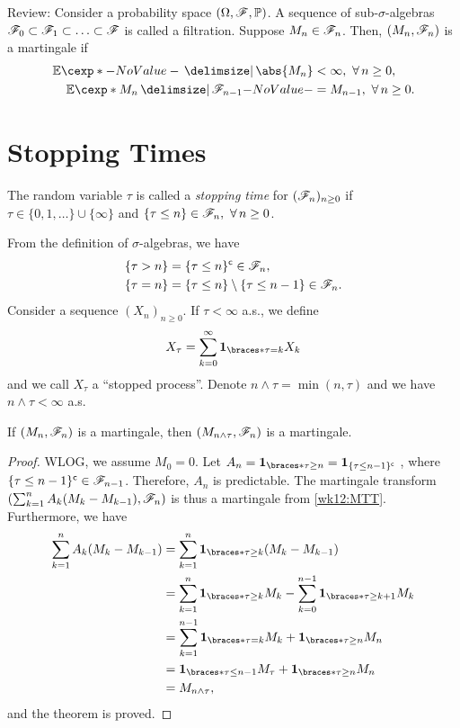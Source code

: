 \documentclass[12pt]{article}
\begin{document}

Review: Consider a probability space $(\Omega, \scF, \P)$. A sequence of sub-$\sigma$-algebras $\mathscr{F}_0 \subset \mathscr{F}_1 \subset \ldots \subset \mathscr{F}$ is called a filtration. Suppose $M_n \in \mathscr{F}_n$. Then, $(M_n, \mathscr{F}_n)$ is a martingale if 
\begin{align*}
\E \abs{M_n} &< \infty,\ \forall n \geq 0, \\
\E[M_n \given \scF_{n-1}] &= M_{n-1},\ \forall n \geq 0. 
\end{align*}

\section{Stopping Times}

\begin{Definition}
The random variable $\tau$ is called a \emph{stopping time} for $(\mathscr{F}_n)_{n\geq0}$ if $\tau \in \{0,1,\ldots\} \cup \{\infty\}$ and $\{\tau \leq n\} \in \scF_n,\ \forall n \geq 0$.
\end{Definition}

From the definition of $\sigma$-algebras, we have
\begin{align*}
\{\tau > n\} &= \{\tau \leq n\}^{\mathsf{c}} \in \mathscr{F}_n, \\
\{\tau = n\} &= \{\tau \leq n\} \setminus \{\tau \leq n-1\} \in \mathscr{F}_n.
\end{align*}
Consider a sequence $(X_n)_{n \geq 0}$. If $\tau < \infty$ a.s., we define 
\begin{align*}
X_\tau = \sum_{k=0}^\infty \indicator{\tau=k}X_k
\end{align*}
and we call $X_\tau$ a ``stopped process''.  Denote $n \wedge \tau = \min(n, \tau)$ and we have $n \wedge \tau < \infty$ a.s. 

\begin{Theorem} \label{wk13:Thm:StoppingProcess}
If $(M_n, \mathscr{F}_n)$ is a martingale, then $(M_{n \wedge \tau}, \mathscr{F}_n)$ is a martingale.
\end{Theorem}
\begin{proof}
WLOG, we assume $M_0 = 0$. Let $A_n = \indicator{\tau \geq n} = \indicatore{\{\tau \leq n-1\}\setcomp}$ , where $\{\tau \leq n-1\}^{\mathsf{c}} \in \mathscr{F}_{n-1}$. Therefore, $A_n$ is predictable. The martingale transform $\left(\sum_{k=1}^n A_k (M_k - M_{k-1}), \mathscr{F}_n\right)$ is thus a martingale from \cref{wk12:MTT}. Furthermore, we have
\begin{align*}
\sum_{k=1}^n A_k (M_k - M_{k-1})
&= \sum_{k=1}^n \indicator{\tau \geq k} (M_k - M_{k-1}) \\
&= \sum_{k=1}^n \indicator{\tau \geq k} M_k - \sum_{k=0}^{n-1} \indicator{\tau \geq k+1} M_k \\
&= \sum_{k=1}^{n-1} \indicator{\tau = k} M_k + \indicator{\tau \geq n} M_n \\
&= \indicator{\tau \leq n-1} M_\tau + \indicator{\tau \geq n} M_n \\
&= M_{n \wedge \tau},
\end{align*}
and the theorem is proved.
\end{proof}
\end{document}
